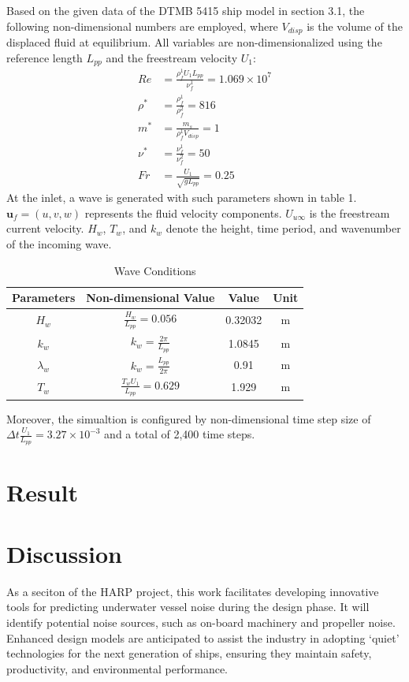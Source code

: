 \documentclass[12pt]{article} %
\begin{document}
Based on the given data of the DTMB 5415 ship model in section 3.1, the following non-dimensional numbers are employed, where \( V_{disp} \) is the volume of the displaced fluid at equilibrium. All variables are non-dimensionalized using the reference length \( L_{pp} \) and the freestream velocity \( U_1 \):
\begin{align*}
    Re &= \frac{\rho_f^1 U_1 L_{pp}}{\nu_f^1} = 1.069 \times 10^7 \\
    \rho^* &= \frac{\rho_f^1}{\rho_f^2} = 816 \\
    m^* &= \frac{m_s}{\rho_f^1 V_{disp}} = 1 \\
    \nu^* &= \frac{\nu_f^1}{\nu_f^2} = 50 \\
    Fr &= \frac{U_1}{\sqrt{g L_{pp}}} = 0.25
\end{align*}
At the inlet, a wave is generated with such parameters shown in table 1. \(\mathbf{u}_f = (u, v, w)\) represents the fluid velocity components. \(U_{u\infty}\) is the 
freestream current velocity. \(H_w\), \(T_w\), and \(k_w\) denote the height, time period, and 
wavenumber of the incoming wave.
\begin{table}[ht]
    \caption{Wave Conditions}
    \centering
    \begin{tabular}{|c|c|c|c|}
        \hline
        Parameters & Non-dimensional Value &Value & Unit\\
        \hline   
        $H_w$ & \(\frac{H_w}{L_{pp}} = 0.056\) &0.32032 & m \\
        $k_w$ & \(k_w = \frac{2\pi}{L_{pp}}\) &1.0845 & m\\
        $\lambda_w$ & \(k_w = \frac{L_{pp}}{2\pi}\) &0.91 & m\\
        $T_w$ & \(\frac{T_w U_1}{L_{pp}} = 0.629\) &1.929 & m \\
        \hline
    \end{tabular}
\end{table}

Moreover, the simualtion is configured by non-dimensional time step size of \(\Delta t \frac{U_1}{L_{pp}} = 3.27 \times 10^{-3}\) and a total of 2,400 time steps.


\section{Result}
\section{Discussion}
As a seciton of the HARP project, this work facilitates developing innovative tools for predicting underwater vessel noise during the design phase. It will identify potential noise sources, such as on-board machinery and propeller noise. Enhanced design models are anticipated to assist the industry in adopting `quiet' technologies for the next generation of ships, ensuring they maintain safety, productivity, and environmental performance.
\end{document}
